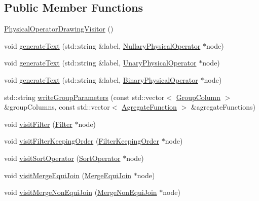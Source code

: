 \subsection*{Public Member Functions}
\begin{DoxyCompactItemize}
\item 
\hyperlink{class_physical_operator_drawing_visitor_a2168858696bd1ce675cef6b895fe995b}{Physical\+Operator\+Drawing\+Visitor} ()
\item 
void \hyperlink{class_physical_operator_drawing_visitor_a50acb8aae6d2b5fffff964f7d84b079f}{generate\+Text} (std\+::string \&label, \hyperlink{class_nullary_physical_operator}{Nullary\+Physical\+Operator} $\ast$node)
\item 
void \hyperlink{class_physical_operator_drawing_visitor_ab2637eab548a1c1d832a877363ede4a9}{generate\+Text} (std\+::string \&label, \hyperlink{class_unary_physical_operator}{Unary\+Physical\+Operator} $\ast$node)
\item 
void \hyperlink{class_physical_operator_drawing_visitor_a3abc3dcacc46a1004f7a9fb26f56154b}{generate\+Text} (std\+::string \&label, \hyperlink{class_binary_physical_operator}{Binary\+Physical\+Operator} $\ast$node)
\item 
std\+::string \hyperlink{class_physical_operator_drawing_visitor_a4729d5a2f38e5318f44149942fb8e3c3}{write\+Group\+Parameters} (const std\+::vector$<$ \hyperlink{class_group_column}{Group\+Column} $>$ \&group\+Columns, const std\+::vector$<$ \hyperlink{class_agregate_function}{Agregate\+Function} $>$ \&agregate\+Functions)
\item 
void \hyperlink{class_physical_operator_drawing_visitor_af5a712a2a8dac447846849d91d20821e}{visit\+Filter} (\hyperlink{class_filter}{Filter} $\ast$node)
\item 
void \hyperlink{class_physical_operator_drawing_visitor_a0e517a5b635ad9dd2624ca2ac5f623e6}{visit\+Filter\+Keeping\+Order} (\hyperlink{class_filter_keeping_order}{Filter\+Keeping\+Order} $\ast$node)
\item 
void \hyperlink{class_physical_operator_drawing_visitor_af0aaa68b27e6e562744b0c8211a63b9a}{visit\+Sort\+Operator} (\hyperlink{class_sort_operator}{Sort\+Operator} $\ast$node)
\item 
void \hyperlink{class_physical_operator_drawing_visitor_a78f01a744a33b84011ddedca236e95e1}{visit\+Merge\+Equi\+Join} (\hyperlink{class_merge_equi_join}{Merge\+Equi\+Join} $\ast$node)
\item 
void \hyperlink{class_physical_operator_drawing_visitor_acdfdd3b9f711abff9fb064495e8512e1}{visit\+Merge\+Non\+Equi\+Join} (\hyperlink{class_merge_non_equi_join}{Merge\+Non\+Equi\+Join} $\ast$node)

\end{DoxyCompactItemize}
